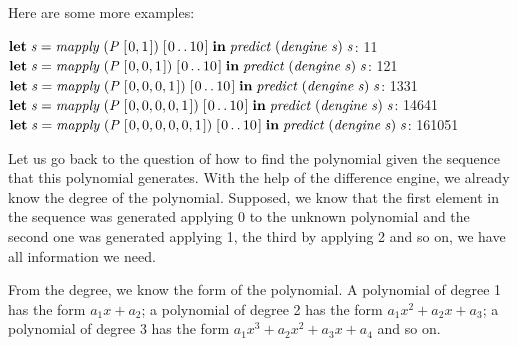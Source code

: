 \documentclass[tikz]{scrreprt}
\newcommand{\Conid}[1]{\mathit{#1}}
\newcommand{\Varid}[1]{\mathit{#1}}
\begin{document}
Here are some more examples:

\begin{minipage}{\textwidth}
\ensuremath{\mathbf{let}\;\Varid{s}\mathrel{=}\Varid{mapply}\;(\Conid{P}\;[\mskip1.5mu \mathrm{0},\mathrm{1}\mskip1.5mu])\;[\mskip1.5mu \mathrm{0}\mathinner{\ldotp\ldotp}\mathrm{10}\mskip1.5mu]\;\mathbf{in}\;\Varid{predict}\;(\Varid{dengine}\;\Varid{s})\;\Varid{s}}: 11\\
\ensuremath{\mathbf{let}\;\Varid{s}\mathrel{=}\Varid{mapply}\;(\Conid{P}\;[\mskip1.5mu \mathrm{0},\mathrm{0},\mathrm{1}\mskip1.5mu])\;[\mskip1.5mu \mathrm{0}\mathinner{\ldotp\ldotp}\mathrm{10}\mskip1.5mu]\;\mathbf{in}\;\Varid{predict}\;(\Varid{dengine}\;\Varid{s})\;\Varid{s}}: 121\\
\ensuremath{\mathbf{let}\;\Varid{s}\mathrel{=}\Varid{mapply}\;(\Conid{P}\;[\mskip1.5mu \mathrm{0},\mathrm{0},\mathrm{0},\mathrm{1}\mskip1.5mu])\;[\mskip1.5mu \mathrm{0}\mathinner{\ldotp\ldotp}\mathrm{10}\mskip1.5mu]\;\mathbf{in}\;\Varid{predict}\;(\Varid{dengine}\;\Varid{s})\;\Varid{s}}: 1331\\
\ensuremath{\mathbf{let}\;\Varid{s}\mathrel{=}\Varid{mapply}\;(\Conid{P}\;[\mskip1.5mu \mathrm{0},\mathrm{0},\mathrm{0},\mathrm{0},\mathrm{1}\mskip1.5mu])\;[\mskip1.5mu \mathrm{0}\mathinner{\ldotp\ldotp}\mathrm{10}\mskip1.5mu]\;\mathbf{in}\;\Varid{predict}\;(\Varid{dengine}\;\Varid{s})\;\Varid{s}}: 14641\\
\ensuremath{\mathbf{let}\;\Varid{s}\mathrel{=}\Varid{mapply}\;(\Conid{P}\;[\mskip1.5mu \mathrm{0},\mathrm{0},\mathrm{0},\mathrm{0},\mathrm{0},\mathrm{1}\mskip1.5mu])\;[\mskip1.5mu \mathrm{0}\mathinner{\ldotp\ldotp}\mathrm{10}\mskip1.5mu]\;\mathbf{in}\;\Varid{predict}\;(\Varid{dengine}\;\Varid{s})\;\Varid{s}}: 161051
\end{minipage}

Let us go back to the question of how to find the polynomial
given the sequence that this polynomial generates.
With the help of the difference engine, we already know
the degree of the polynomial. 
Supposed, we know that the first element in the sequence
was generated applying 0 to the unknown polynomial and
the second one was generated applying 1,
the third by applying 2 and so on,
we have all information we need.

From the degree, we know the form of the polynomial.
A polynomial of degree 1 has the form $a_1x + a_2$;
a polynomial of degree 2 has the form $a_1x^2 + a_2x + a_3$;
a polynomial of degree 3 has the form $a_1x^3 + a_2x^2 + a_3x + a_4$
and so on.
\end{document}
